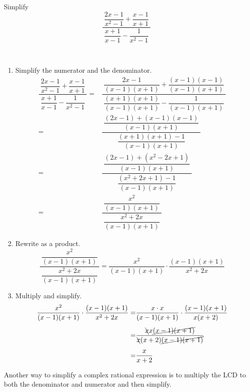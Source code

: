 \documentclass[en,12pt]{elegantbook}
\let\BeginKnitrBlock\begin \let\EndKnitrBlock\end
\begin{document}
\BeginKnitrBlock{example}
\protect\hypertarget{exm:unnamed-chunk-61}{}{\label{exm:unnamed-chunk-61} }
Simplify
\[
\dfrac{~\dfrac{2x-1}{x^2-1}+\dfrac{x-1}{x+1}~}{~\dfrac{x+1}{x-1}-\dfrac{1}{x^2-1}~}
\]
\EndKnitrBlock{example}

\BeginKnitrBlock{solution}
{}\\

\begin{enumerate}
\def\labelenumi{\arabic{enumi}.}
\item
  Simplify the numerator and the denominator.
  \[
       \begin{aligned}
           \dfrac{~\dfrac{2x-1}{x^2-1}+\dfrac{x-1}{x+1}~}{~\dfrac{x+1}{x-1}-\dfrac{1}{x^2-1}~}
           =&\dfrac{
               ~\dfrac{2x-1}{(x-1)(x+1)}+\dfrac{(x-1)(x-1)}{(x-1)(x+1)}~
           }{~
               \dfrac{(x+1)(x+1)}{(x-1)(x+1)}-\dfrac{1}{(x-1)(x+1)}~
           }\\[5pt]
           =&\dfrac{
               ~\dfrac{(2x-1)+(x-1)(x-1)}{(x-1)(x+1)}~
           }{
               ~\dfrac{(x+1)(x+1)-1}{(x-1)(x+1)}~
           }\\[5pt]
           =&\dfrac{
               ~\dfrac{(2x-1)+(x^2-2x+1)}{(x-1)(x+1)}~
           }{
               ~\dfrac{(x^2+2x+1)-1}{(x-1)(x+1)}~
           }\\[5pt]
           =&\dfrac{
               ~\dfrac{x^2}{(x-1)(x+1)}~
           }{
               ~\dfrac{x^2+2x}{(x-1)(x+1)}~
           }
       \end{aligned}
   \]
\item
  Rewrite as a product.
  \[
       \dfrac{
           ~\dfrac{x^2}{(x-1)(x+1)}~
       }{
           ~\dfrac{x^2+2x}{(x-1)(x+1)}~
       }
       =\dfrac{x^2}{(x-1)(x+1)}\cdot \dfrac{(x-1)(x+1)}{x^2+2x}
   \]
\item
  Multiply and simplify.
  \[
       \begin{aligned}
       \dfrac{x^2}{(x-1)(x+1)}\cdot \dfrac{(x-1)(x+1)}{x^2+2x}
       =&\dfrac{x\cdot x}{(x-1)(x+1)}\cdot \dfrac{(x-1)(x+1)}{x(x+2)}\\[5pt]
       =& \dfrac{\bcancel{x}x\cancel{(x-1)(x+1)}}{\bcancel{x}(x+2)\cancel{(x-1)(x+1)}}\\[5pt]
       =& \dfrac{x}{x+2}
       \end{aligned}
   \]
\end{enumerate}
\EndKnitrBlock{solution}

\BeginKnitrBlock{rmdnote}
Another way to simplify a complex rational expression is to multiply the LCD to both the denominator and numerator and then simplify.
\EndKnitrBlock{rmdnote}
\end{document}
